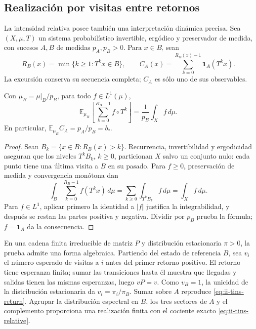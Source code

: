 \subsection{Realización por visitas entre retornos}
\label{subsec:ii-tins-retornos}

La intensidad relativa posee también una interpretación dinámica precisa.
Sea $(X,\mu,T)$ un sistema probabilístico invertible, ergódico y preservador
de medida, con sucesos $A,B$ de medidas $p_A,p_B>0$. Para $x\in B$, sean
\[
 R_B(x)=\min\{k\ge1:T^kx\in B\},\qquad
 C_A(x)=\sum_{k=0}^{R_B(x)-1}\mathbf1_A(T^kx).
\]
La excursión conserva su secuencia completa; $C_A$ es sólo uno de sus observables.

\begin{theorem}
\label{thm:ii-tins-return}
Con $\mu_B=\mu|_B/p_B$, para todo $f\in L^1(\mu)$,
\begin{equation}
 \mathbb E_{\mu_B}\!\left[\sum_{k=0}^{R_B-1}f\circ T^k\right]
 =\frac1{p_B}\int_Xf\,d\mu.
 \label{eq:ii-tins-return}
\end{equation}
En particular, $\mathbb E_{\mu_B}C_A=p_A/p_B=b_*$.
\end{theorem}
\begin{proof}
Sean $B_k=\{x\in B:R_B(x)>k\}$. Recurrencia, invertibilidad y
ergodicidad aseguran que los niveles $T^kB_k$, $k\ge0$, particionan $X$
salvo un conjunto nulo: cada punto tiene una última visita a $B$ en su
pasado. Para $f\ge0$, preservación de medida y convergencia monótona dan
\[
 \int_B\sum_{k=0}^{R_B-1}f(T^kx)\,d\mu
 =\sum_{k\ge0}\int_{T^kB_k}f\,d\mu=\int_Xf\,d\mu.
\]
Para $f\in L^1$, aplicar primero la identidad a $|f|$ justifica la
integrabilidad, y después se restan las partes positiva y negativa.
Dividir por $p_B$ prueba la fórmula; $f=\mathbf1_A$ da la consecuencia.
\end{proof}

En una cadena finita irreducible de matriz $P$ y distribución estacionaria
$\pi>0$, la prueba admite una forma algebraica. Partiendo del estado de
referencia $B$, sea $v_i$ el número esperado de visitas a $i$ antes del
primer retorno positivo. El retorno tiene esperanza finita; sumar las
transiciones hasta él muestra que llegadas y salidas tienen las mismas
esperanzas, luego $vP=v$. Como $v_B=1$, la unicidad de la distribución
estacionaria da $v_i=\pi_i/\pi_B$. Sumar sobre $A$ reproduce
\eqref{eq:ii-tins-return}. Agrupar la distribución espectral en $B$, los
tres sectores de $A$ y el complemento proporciona una realización finita
con el cociente exacto \eqref{eq:ii-tins-relative}.

